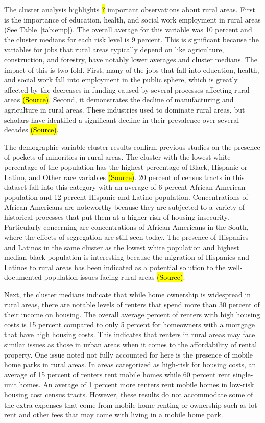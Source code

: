  The cluster analysis highlights \hl{?} important observations about rural areas. First is the importance of education, health, and social work employment in rural areas (See Table~\ref{tab:emp}). The overall average for this variable was 10 percent and the cluster medians for each risk level is 9 percent. This is significant because the variables for jobs that rural areas typically depend on like agriculture, construction, and forestry, have notably lower averages and cluster medians. The impact of this is two-fold. First, many of the jobs that fall into education, health, and social work fall into employment in the public sphere, which is greatly affected by the decreases in funding caused by several processes affecting rural areas \hl{(Source)}. Second, it demonstrates the decline of manufacturing and agriculture in rural areas. These industries used to dominate rural areas, but scholars have identified a significant decline in their prevalence over several decades \hl{(Source)}. 
 
 The demographic variable cluster results confirm previous studies on the presence of pockets of minorities in rural areas. The cluster with the lowest white percentage of the population has the highest percentage of Black, Hispanic or Latino, and Other race variables \hl{(Source)}. 20 percent of census tracts in this dataset fall into this category with an average of 6 percent African American population and 12 percent Hispanic and Latino population. Concentrations of African Americans are noteworthy because they are subjected to a variety of historical processes that put them at a higher risk of housing insecurity. Particularly concerning are concentrations of African Americans in the South, where the effects of segregation are still seen today. The presence of Hispanics and Latinos in the same cluster as the lowest white population and highest median black population is interesting because the migration of Hispanics and Latinos to rural areas has been indicated as a potential solution to the well-documented population issues facing rural areas \hl{(Source)}.
 
 Next, the cluster medians indicate that while home ownership is widespread in rural areas, there are notable levels of renters that spend more than 30 percent of their income on housing. The overall average percent of renters with high housing costs is 15 percent compared to only 5 percent for homeowners with a mortgage that have high housing costs. This indicates that renters in rural areas may face similar issues as those in urban areas when it comes to the affordability of rental property. One issue noted not fully accounted for here is the presence of mobile home parks in rural areas. In areas categorized as high-risk for housing costs, an average of 15 percent of renters rent mobile homes while 60 percent rent single-unit homes. An average of 1 percent more renters rent mobile homes in low-risk housing cost census tracts. However, these results do not accommodate some of the extra expenses that come from mobile home renting or ownership such as lot rent and other fees that may come with living in a mobile home park. 
 

